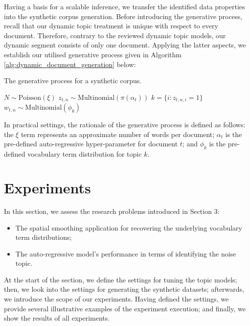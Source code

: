 \documentclass{mpaper}
\begin{document}
\par Having a basis for a scalable inference, we transfer the identified data properties into the synthetic corpus generation. Before introducing the generative process, recall that our dynamic topic treatment is unique with respect to every document. Therefore, contrary to the reviewed dynamic topic models, our dynamic segment consists of only one document. Applying the latter aspects, we establish our utilised generative process given in Algorithm \ref{alg:dynamic_document_generation} below:
\begin{algorithm}[H]
\caption{The generative process for a synthetic corpus.}
\label{alg:dynamic_document_generation}
\begin{algorithmic}[2]
\State $N \sim \mbox{Poisson}(\xi)$
\State $z_{t, n} \sim \mbox{Multinomial}(\pi(\alpha_t))$
\State $k = \{i : z_{t, n, i} = 1\}$
\State $w_{t, n} \sim \mbox{Multinomial}(\phi_k)$
\EndFor
\EndFor
\end{algorithmic}
\end{algorithm}
In practical settings, the rationale of the generative process is defined as follows: the $\xi$ term represents an approximate number of words per document; $\alpha_t$ is the pre-defined auto-regressive hyper-parameter for document $t$; and $\phi_k$ is the pre-defined vocabulary term distribution for topic $k$.

 \section{Experiments}

\par In this section, we assess the research problems introduced in Section 3:
\begin{itemize}
	\item The spatial smoothing application for recovering the underlying vocabulary term distributions;
	\item The auto-regressive model's performance in terms of identifying the noise topic.
\end{itemize}
At the start of the section, we define the settings for tuning the topic models; then, we look into the settings for generating the synthetic datasets; afterwards, we introduce the scope of our experiments. Having defined the  settings, we provide several illustrative examples of the experiment execution; and finally, we show the results of all experiments.
\end{document}

